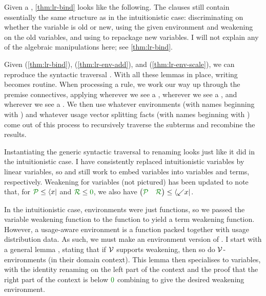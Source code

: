 
Given a , \cref{thm:lr-bind} looks like the following.
The  clauses still contain essentially the same structure as
in the intuitionistic case: discriminating on whether the variable is old or
new, using the given environment \AgdaBound{$\rho$} and weakening on the old
variables, and using  to repackage new variables.
I will not explain any of the algebraic manipulations here; see
\cref{thm:lr-bind}.


Given  (\cref{thm:lr-bind}), 
(\cref{thm:lr-env-add}), and  (\cref{thm:lr-env-scale}),
we can reproduce the syntactic traversal .
With all these lemmas in place, writing 
becomes routine.
When processing a rule, we work our way up through the
premise connectives, applying  wherever we see a
,  wherever we see a
, and  wherever we see a
.
We then use whatever environments (with names beginning with
\AgdaBound{$\rho$}) and whatever usage vector splitting facts (with names
beginning with ) come out of this process to recursively
traverse the subterms and recombine the results.


Instantiating the generic syntactic traversal  to renaming
looks just like it did in the intuitionistic case.
I have consistently replaced intuitionistic variables by linear variables, so
 and  still work to embed
variables into variables and terms, respectively.
Weakening for variables  (not pictured) has been
updated to note that, for $\grP \leq \bra x$ and $\grR \leq \gr0$, we also have
$\begin{pmatrix} \grP & \grR \end{pmatrix} \leq \bra{{\swarrow}x}$.


In the intuitionistic case, environments were just functions, so we passed the
variable weakening function  to the function
 to yield a term weakening function.
However, a usage-aware environment is a function packed together with usage
distribution data.
As such, we must make an environment version of .
I start with a general lemma , stating that if
$\mathcal V$ supports weakening, then so do $\mathcal V$-environments (in their domain
context).
This lemma then specialises to variables, with the identity renaming
 on the left part of the context and the proof
 that the right part of the context is below $\gr0$ combining
to give the desired weakening environment.

